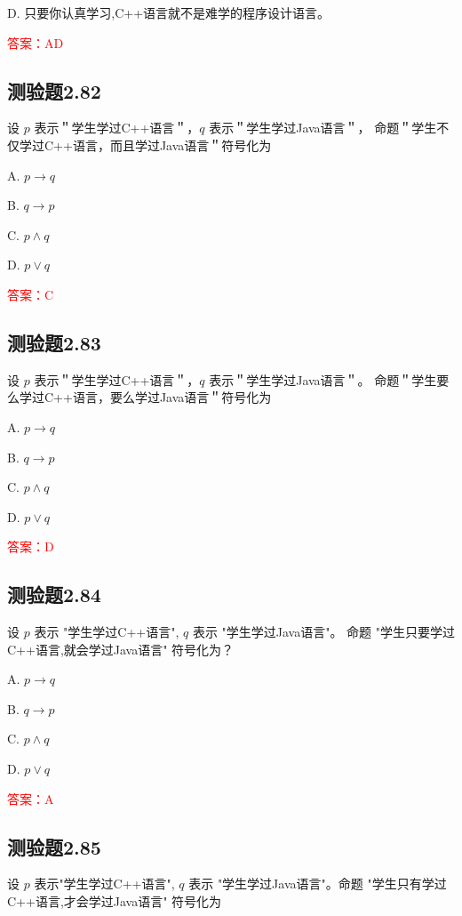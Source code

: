 \documentclass[UTF8, heading=true]{ctexart}
\begin{document}
D. 只要你认真学习,C++语言就不是难学的程序设计语言。

\textcolor{red}{答案：AD}

\subsection{测验题2.82}

设 $p$ 表示＂学生学过C++语言＂，$q$ 表示＂学生学过Java语言＂，
命题＂学生不仅学过C++语言，而且学过Java语言＂符号化为 $\qquad$

A. $p \rightarrow q$

B. $q \rightarrow p$

C. $p \wedge q$

D. $p \vee q$

\textcolor{red}{答案：C}

\subsection{测验题2.83}

设 $p$ 表示＂学生学过C++语言＂，$q$ 表示＂学生学过Java语言＂。
命题＂学生要么学过C++语言，要么学过Java语言＂符号化为 $\qquad$

A. $
p \rightarrow q
$


B. $
q \rightarrow p
$


C. $
p \wedge q
$


D. $
p \vee q
$

\textcolor{red}{答案：D}



\subsection{测验题2.84}

设 $p$ 表示 "学生学过C++语言", $q$ 表示 "学生学过Java语言"。
命题 "学生只要学过C++语言,就会学过Java语言" 符号化为？

A. $ p \rightarrow q$

B. $ q \rightarrow p$

C. $ p \wedge q$

D. $ p \vee q$

\textcolor{red}{答案：A}

\subsection{测验题2.85}

设 $p$ 表示"学生学过C++语言", $q$ 表示 "学生学过Java语言"。命题 "学生只有学过C++语言,才会学过Java语言" 符号化为 $\qquad$
\end{document}

